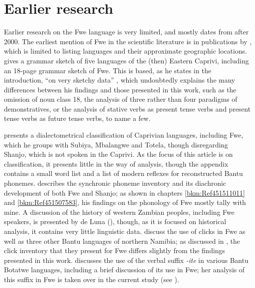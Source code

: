 \section{Earlier research}
\label{bkm:Ref492223019}\hypertarget{Toc75352598}{}
Earlier research on the Fwe language is very limited, and mostly dates from after 2000. The earliest mention of Fwe in the scientific literature is in publications by {\citet{Fortune1970}}, which is limited to listing languages and their approximate geographic locations. {\citet{Baumbach1997}} gives a grammar sketch of five languages of the (then) Eastern Caprivi, including an 18-page grammar sketch of Fwe. This is based, as he states in the introduction, “on very sketchy data” \citep[308]{Baumbach1997}, which undoubtedly explains the many differences between his findings and those presented in this work, such as the omission of noun class 18, the analysis of three rather than four paradigms of demonstratives, or the analysis of stative verbs as present tense verbs and present tense verbs as future tense verbs, to name a few.

{\citet{Seidel2005}} presents a dialectometrical classification of Caprivian languages, including Fwe, which he groups with Subiya, Mbalangwe and Totela, though disregarding Shanjo, which is not spoken in the Caprivi. As the focus of this article is on classification, it presents little in the way of analysis, though the appendix contains a small word list and a list of modern reflexes for reconstructed Bantu phonemes. {\citet{Bostoen2009}} describes the synchronic phoneme inventory and its diachronic development of both Fwe and Shanjo; as shown in chapters \ref{bkm:Ref451511011} and \ref{bkm:Ref451507583}, his findings on the phonology of Fwe mostly tally with mine. A discussion of the history of western Zambian peoples, including Fwe speakers, is presented by de Luna (\citealt{Luna2008,Luna2010,Luna2016}), though, as it is focused on historical analysis, it contains very little linguistic data. {\citet{BostoenSands2012}} discuss the use of clicks in Fwe as well as three other Bantu languages of northern Namibia; as discussed in , the click inventory that they present for Fwe differs slightly from the findings presented in this work. {\citet{Crane2012}} discusses the use of the verbal suffix \textit{-ite} in various Bantu Botatwe languages, including a brief discussion of its use in Fwe; her analysis of this suffix in Fwe is taken over in the current study (see ).

